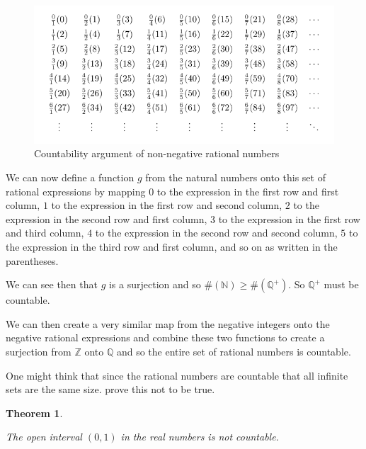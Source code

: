 \documentclass[
]{book}
\newtheorem{theorem}{Theorem}[chapter]
\theoremstyle{definition}
\theoremstyle{definition}
\theoremstyle{definition}
\theoremstyle{definition}
\theoremstyle{remark}
\begin{document}
\begin{figure}

{\centering \includegraphics[width=1\linewidth]{tikz/table-natural-integers3} 

}

\caption{Countability argument of non-negative rational numbers}\label{fig:rational-countable}
\end{figure}

We can now define a function \(g\) from the natural numbers onto this set of rational expressions by mapping \(0\) to the expression in the first row and first column, \(1\) to the expression in the first row and second column, \(2\) to the expression in the second row and first column, \(3\) to the expression in the first row and third column, \(4\) to the expression in the second row and second column, \(5\) to the expression in the third row and first column, and so on as written in the parentheses.

We can see then that \(g\) is a surjection and so \(\#(\mathbb{N}) \geq \#(\mathbb{Q}^+)\). So \(\mathbb{Q}^+\) must be countable.

We can then create a very similar map from the negative integers onto the negative rational expressions and combine these two functions to create a surjection from \(\mathbb{Z}\) onto \(\mathbb{Q}\) and so the entire set of rational numbers is countable.

One might think that since the rational numbers are countable that all infinite sets are the same size. \cite{Cantor} prove this not to be true.

\begin{theorem}
\protect\hypertarget{thm:unlabeled-div-74}{}\label{thm:unlabeled-div-74}

The open interval \((0,1)\) in the real numbers is not countable.

\end{theorem}
\end{document}
